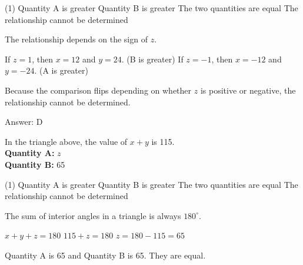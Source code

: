 \documentclass[11pt,paper=a4,answers]{exam}
\begin{document}
\begin{questions}
\begin{tasks}(1)
\task[A)] Quantity A is greater
\task[B)] Quantity B is greater
\task[C)] The two quantities are equal
\task[D)] The relationship cannot be determined
\end{tasks}

\begin{solution}
The relationship depends on the sign of $z$.
\vspace{5pt}
\begin{center}
If $z = 1$, then $x = 12$ and $y = 24$. (B is greater)
\vspace{5pt}
If $z = -1$, then $x = -12$ and $y = -24$. (A is greater)
\end{center}
\vspace{5pt}
Because the comparison flips depending on whether $z$ is positive or negative, the relationship cannot be determined.

Answer: \colorbox{yellow!100}{D}
\end{solution}

\vspace{1cm}

\question
\begin{center}
\end{center}
In the triangle above, the value of $x + y$ is 115.
\vspace{5pt}\\
\textbf{Quantity A: } $z$ \\
\vspace{5pt}
\textbf{Quantity B: } 65

\begin{tasks}(1)
\task[A)] Quantity A is greater
\task[B)] Quantity B is greater
\task[C)] The two quantities are equal
\task[D)] The relationship cannot be determined
\end{tasks}

\begin{solution}
The sum of interior angles in a triangle is always $180^\circ$.
\vspace{5pt}
\begin{center}
$x + y + z = 180$
\vspace{5pt}
$115 + z = 180$
\vspace{5pt}
$z = 180 - 115 = 65$
\end{center}
\vspace{5pt}
Quantity A is 65 and Quantity B is 65. They are equal.


\end{solution}
\end{questions}
\end{document}
